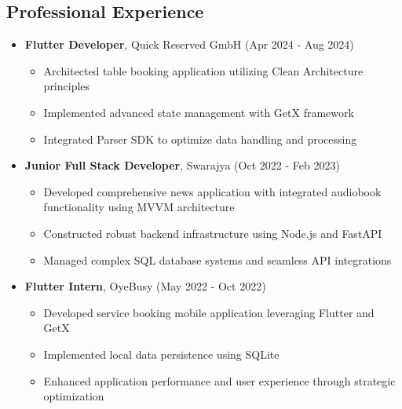 \documentclass[a4paper,10pt]{article}
\begin{document}
\begin{multicols}{2}
\section*{Professional Experience}
\vspace{-0.5em}
\begin{itemize}[leftmargin=1em,itemsep=0.5em,parsep=0pt]
    \item \textbf{Flutter Developer}, Quick Reserved GmbH (Apr 2024 - Aug 2024)
        \begin{itemize}[leftmargin=1em,itemsep=0.2em,parsep=0pt]
            \item Architected table booking application utilizing Clean Architecture principles
            \item Implemented advanced state management with GetX framework
            \item Integrated Parser SDK to optimize data handling and processing
        \end{itemize}
    \item \textbf{Junior Full Stack Developer}, Swarajya (Oct 2022 - Feb 2023)
        \begin{itemize}[leftmargin=1em,itemsep=0.2em,parsep=0pt]
            \item Developed comprehensive news application with integrated audiobook functionality using MVVM architecture
            \item Constructed robust backend infrastructure using Node.js and FastAPI
            \item Managed complex SQL database systems and seamless API integrations
        \end{itemize}
    \item \textbf{Flutter Intern}, OyeBusy (May 2022 - Oct 2022)
        \begin{itemize}[leftmargin=1em,itemsep=0.2em,parsep=0pt]
            \item Developed service booking mobile application leveraging Flutter and GetX
            \item Implemented local data persistence using SQLite
            \item Enhanced application performance and user experience through strategic optimization
        \end{itemize}
\end{itemize}


\end{multicols}
\end{document}
